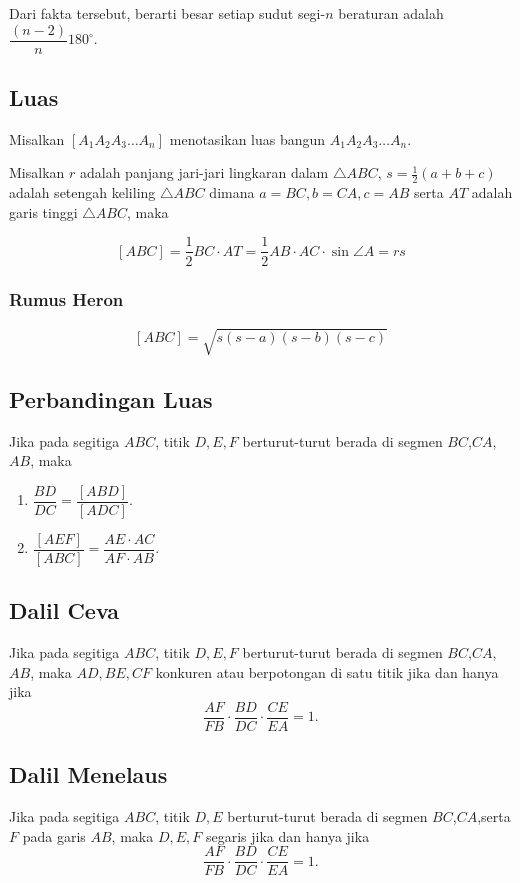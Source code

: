     Dari fakta tersebut, berarti besar setiap sudut segi-$n$ beraturan adalah $\dfrac{(n-2)}{n}180^\circ$.
    
    \subsection{Luas}
    Misalkan $[A_1A_2A_3\dots A_n]$ menotasikan luas bangun $A_1A_2A_3\dots A_n$. 
    
    Misalkan $r$ adalah panjang jari-jari lingkaran dalam $\triangle ABC$, $s=\frac{1}{2}(a+b+c)$ adalah setengah keliling $\triangle ABC$ dimana $a=BC, b=CA, c=AB$ serta $AT$ adalah garis tinggi $\triangle ABC$, maka
    
    $$[ABC]  = \dfrac{1}{2}BC \cdot AT = \dfrac{1}{2}AB\cdot AC \cdot \sin \angle A = rs$$
    
    \subsubsection{Rumus Heron}
    $$[ABC]  = \sqrt{s(s-a)(s-b)(s-c)}$$
    
    \subsection{Perbandingan Luas}
    Jika pada segitiga $ABC$, titik $D,E,F$ berturut-turut berada di segmen $BC$,$CA$,$AB$, maka 
    \begin{enumerate}
        \item $\dfrac{BD}{DC} = \dfrac{[ABD]}{[ADC]}.$
        \item $\dfrac{[AEF]}{[ABC]}=\dfrac{AE \cdot AC}{AF \cdot AB}.$
    \end{enumerate}
    
    \subsection{Dalil Ceva}
    Jika pada segitiga $ABC$, titik $D,E,F$ berturut-turut berada di segmen $BC$,$CA$,$AB$, maka 
    $AD,BE,CF$ konkuren atau berpotongan di satu titik jika dan hanya jika $$\dfrac{AF}{FB} \cdot \dfrac{BD}{DC} \cdot \dfrac{CE}{EA} = 1.$$
    
    \subsection{Dalil Menelaus}
    Jika pada segitiga $ABC$, titik $D,E$ berturut-turut berada di segmen $BC$,$CA$,serta $F$ pada garis $AB$, maka $D,E,F$ segaris jika dan hanya jika
    $$\dfrac{AF}{FB} \cdot \dfrac{BD}{DC} \cdot \dfrac{CE}{EA} = 1.$$
    
